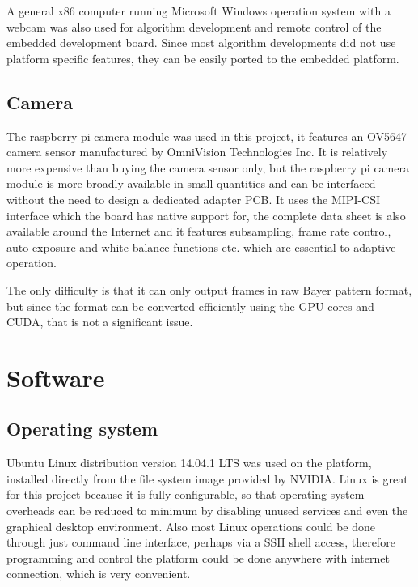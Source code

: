 
A general x86 computer running Microsoft Windows operation system with a webcam was also used for algorithm development and remote control of the embedded development board. Since most algorithm developments did not use platform specific features, they can be easily ported to the embedded platform.

\subsection{Camera}


The raspberry pi camera module was used in this project, it features an OV5647 camera sensor manufactured by OmniVision Technologies Inc. It is relatively more expensive than buying the camera sensor only, but the raspberry pi camera module is more broadly available in small quantities and can be interfaced without the need to design a dedicated adapter PCB. It uses the MIPI-CSI interface which the board has native support for, the complete data sheet is also available around the Internet and it features subsampling, frame rate control, auto exposure and white balance functions etc. which are essential to adaptive operation.

The only difficulty is that it can only output frames in raw Bayer pattern format, but since the format can be converted efficiently using the GPU cores and CUDA, that is not a significant issue.

\section{Software}

\subsection{Operating system}

Ubuntu Linux distribution version 14.04.1 LTS was used on the platform, installed directly from the file system image provided by NVIDIA. Linux is great for this project because it is fully configurable, so that operating system overheads can be reduced to minimum by disabling unused services and even the graphical desktop environment. Also most Linux operations could be done through just command line interface, perhaps via a SSH shell access, therefore programming and control the platform could be done anywhere with internet connection, which is very convenient.

